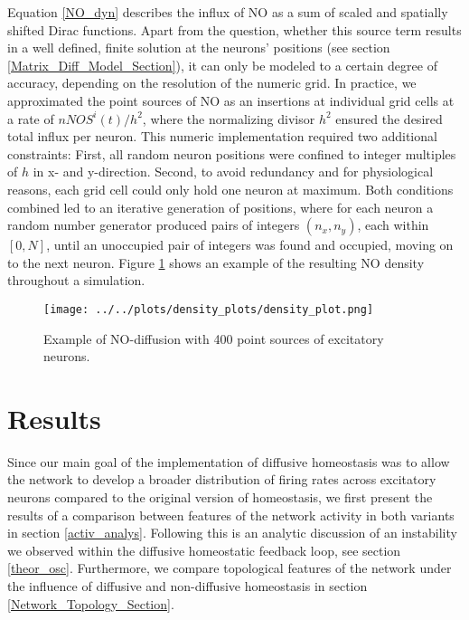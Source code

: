 \documentclass[10pt,a4paper]{article}
\begin{document}
Equation \eqref{NO_dyn} describes the influx of NO as a sum of scaled and spatially shifted Dirac functions. Apart from the question, whether this source term results in a well defined, finite solution at the neurons' positions (see section \ref{Matrix_Diff_Model_Section}), it can only be modeled to a certain degree of accuracy, depending on the resolution of the numeric grid. In practice, we approximated the point sources of NO as an insertions at individual grid cells at a rate of $nNOS^i(t) / h^2$, where the normalizing divisor $h^2$ ensured the desired total influx per neuron. This numeric implementation required two additional constraints: First, all random neuron positions were confined to integer multiples of $h$ in x- and y-direction. Second, to avoid redundancy and for physiological reasons, each grid cell could only hold one neuron at maximum. Both conditions combined led to an iterative generation of positions, where for each neuron a random number generator produced pairs of integers $(n_x,n_y)$, each within $[0,N]$, until an unoccupied pair of integers was found and occupied, moving on to the next neuron. Figure \ref{diff_test_plot} shows an example of the resulting NO density throughout a simulation. 
\begin{figure}[h!]
\begin{center}
\texttt{[image: ../../plots/density\_plots/density\_plot.png]}
\end{center}
\caption{Example of NO-diffusion with 400 point sources of excitatory neurons.}
\label{diff_test_plot}
\end{figure}

\newpage
\section{Results} \label{results}

Since our main goal of the implementation of diffusive homeostasis was to allow the network to develop a broader distribution of firing rates across excitatory neurons compared to the original version of homeostasis, we first present the results of a comparison between features of the network activity in both variants in section \ref{activ_analys}. Following this is an analytic discussion of an instability we observed within the diffusive homeostatic feedback loop, see section \ref{theor_osc}. Furthermore, we compare topological features of the network under the influence of diffusive and non-diffusive homeostasis in section \ref{Network_Topology_Section}. 
\end{document}
